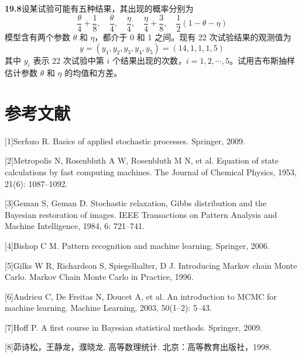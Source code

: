 \documentclass[UTF8,12pt,a4paper,fontset=fandol]{ctexart}
\begin{document}
\noindent\textbf{19.8}\quad 设某试验可能有五种结果，其出现的概率分别为
\[
\frac{\theta}{4}+\frac{1}{8},\quad
\frac{\theta}{4},\quad
\frac{\eta}{4},\quad
\frac{\eta}{4}+\frac{3}{8},\quad
\frac{1}{2}(1-\theta-\eta)
\]
模型含有两个参数 $\theta$ 和 $\eta$，都介于 0 和 1 之间。现有 22 次试验结果的观测值为
\[
y=(y_1,y_2,y_3,y_4,y_5)=(14,1,1,1,5)
\]
其中 $y_i$ 表示 22 次试验中第 $i$ 个结果出现的次数，$i=1,2,\cdots,5$。试用吉布斯抽样估计参数 $\theta$ 和 $\eta$ 的均值和方差。

\section*{参考文献}

[1]\quad Serfozo R. Basics of applied stochastic processes. Springer, 2009.

[2]\quad Metropolis N, Rosenbluth A W, Rosenbluth M N, et al. Equation of state calculations by fast computing machines. The Journal of Chemical Physics, 1953, 21(6): 1087--1092.

[3]\quad Geman S, Geman D. Stochastic relaxation, Gibbs distribution and the Bayesian restoration of images. IEEE Transactions on Pattern Analysis and Machine Intelligence, 1984, 6: 721--741.

[4]\quad Bishop C M. Pattern recognition and machine learning. Springer, 2006.

[5]\quad Gilks W R, Richardson S, Spiegelhalter, D J. Introducing Markov chain Monte Carlo. Markov Chain Monte Carlo in Practice, 1996.

[6]\quad Andrieu C, De Freitas N, Doucet A, et al. An introduction to MCMC for machine learning. Machine Learning, 2003, 50(1--2): 5--43.

[7]\quad Hoff P. A first course in Bayesian statistical methods. Springer, 2009.

[8]\quad 茆诗松，王静龙，濮晓龙. 高等数理统计. 北京：高等教育出版社，1998.
\end{document}
